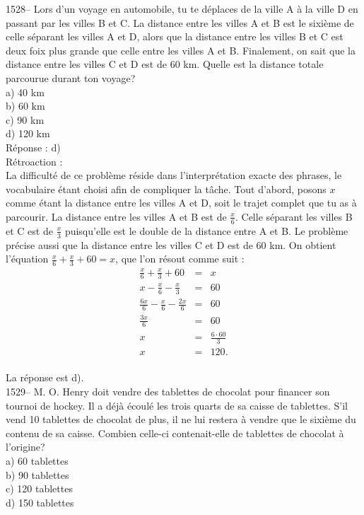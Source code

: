 1528-- Lors d'un voyage en automobile, tu te d\'eplaces de la ville A
\`a la ville D en passant par les villes B et C. La distance entre
les villes A et B est le sixi\`eme de celle s\'eparant les villes A
et D, alors que la distance entre les villes B et C est deux foix
plus grande que celle entre les villes A et B. Finalement, on sait
que la distance entre les villes C et D est de 60 km. Quelle est la distance
totale parcourue durant ton voyage?\\
a) 40 km\\
b) 60 km\\
c) 90 km\\
d) 120 km\\

R\'eponse : d)\\

R\'etroaction :\\
La difficult\'e de ce probl\`eme r\'eside dans l'interpr\'etation
exacte des phrases, le vocabulaire \'etant choisi afin de compliquer
la t\^ache. Tout d'abord, posons $x$ comme \'etant la distance entre
les villes A et D, soit le trajet complet que tu as \`a parcourir.
La distance entre les villes A et B est de $\frac{x}{6}$. Celle
s\'eparant les villes B et C est de $\frac{x}{3}$ puisqu'elle est le
double de la distance entre A et B. Le probl\`eme pr\'ecise aussi
que la distance entre les villes C et D est de 60 km. On obtient
l'\'equation $\frac{x}{6}+\frac{x}{3}+60=x$, que l'on r\'esout comme
suit :
\begin{eqnarray*}
\frac{x}{6}+\frac{x}{3}+60&=&x  \\[3mm]  x-\frac{x}{6}-\frac{x}{3}&=&60
\\[3mm]
\frac{6x}{6}-\frac{x}{6}-\frac{2x}{6}&=&60 \\[3mm] \frac{3x}{6}&=&60
\\[3mm]
x&=&\frac{6\cdot 60}{3} \\[3mm] x&=&120.
\end{eqnarray*}\\
La r\'eponse est d).\\

1529-- M. O. Henry doit vendre des tablettes de chocolat pour
financer son tournoi de hockey. Il a d\'ej\`a \'ecoul\'e les trois
quarts de sa caisse de tablettes. S'il vend 10 tablettes de chocolat
de plus, il ne lui restera \`a vendre que le sixi\`eme du contenu de sa
caisse. Combien celle-ci contenait-elle de tablettes de chocolat \`a
l'origine?\\
a) 60 tablettes\\
b) 90 tablettes\\
c) 120 tablettes\\
d) 150 tablettes\\

